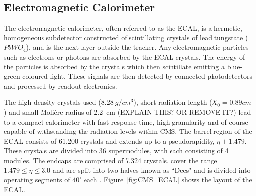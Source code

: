 % 


\subsection{Electromagnetic Calorimeter}
\label{ss:Ecal}
The electromagnetic calorimeter, often referred to as the ECAL, is a hermetic, homogeneous
subdetector constructed of scintillating crystals of lead tungstate ($PbWO_{4}$), and is the next layer
outside the tracker. Any electromagnetic particles such as electrons or photons are absorbed by the ECAL
crystals. The energy of the particles is absorbed by the crystals which then scintillate emitting a blue-green
coloured light. These signals are then detected by connected photodetectors and processed by readout
electronics.

The high density crystals used ($8.28~g/cm^{3}$), short radiation length ($X_{0} = 0.89cm$) and small
Moli\`{e}re radius of 2.2~cm (EXPLAIN THIS? OR REMOVE IT?) lead to a compact calorimeter with fast response
time, high granularity and of course capable of withstanding the radiation levels within CMS. The barrel region of the ECAL consists of 61,200 crystals and extends up to a pseudorapidity, $\eta\pm1.479$. These crystals are
divided into 36 supermodules, with each consisting of 4 modules. The endcaps are comprised of 7,324
crystals, cover the range $1.479\leq\eta\leq3.0$ and are split into two halves known as ``Dees" and is divided
into operating segments of $40^{\circ}$ each \cite{CMS_experiment,ECAL_frontend_monitoring}.
Figure~\ref{fig:CMS_ECAL} shows the layout of the ECAL.

